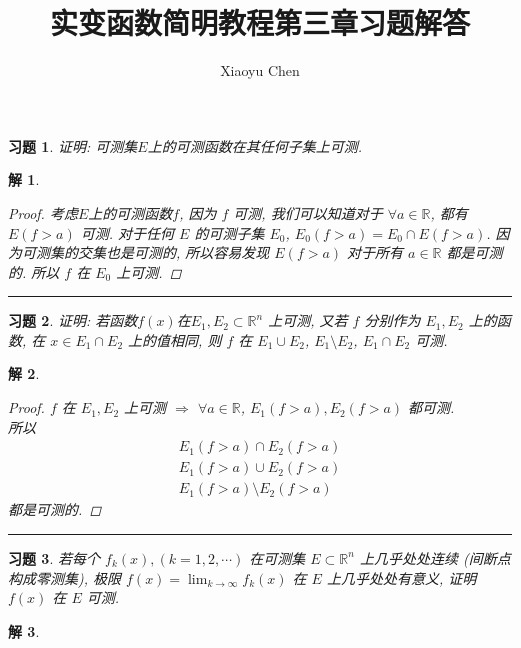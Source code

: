 \documentclass{article}
\title{实变函数简明教程第三章习题解答}
\author{Xiaoyu Chen}
\date{}
\newtheorem{problem}{习题}
\newtheorem{solution}{解}
\begin{document}
\maketitle
\begin{problem}
  证明: 可测集$E$上的可测函数在其任何子集上可测.
\end{problem}
\begin{solution}
  \begin{proof}
    考虑$E$上的可测函数$f$, 因为 $f$ 可测, 我们可以知道对于 $\forall a\in \mathbb{R}$, 都有 $E(f > a)$ 可测.
    对于任何 $E$ 的可测子集 $E_0$, $E_0(f > a) = E_0 \cap E(f > a)$.
    因为可测集的交集也是可测的, 所以容易发现 $E(f > a)$ 对于所有 $a \in \mathbb{R}$ 都是可测的.
    所以 $f$ 在 $E_0$ 上可测.
  \end{proof}
\end{solution}

\hrule

\begin{problem}
  证明: 若函数$f(x)$在$E_1, E_2\subset \mathbb{R}^n$ 上可测, 又若 $f$ 分别作为 $E_1, E_2$ 上的函数, 在 $x\in E_1\cap E_2$ 上的值相同, 则 $f$ 在 $E_1\cup E_2$, $E_1\setminus E_2$, $E_1\cap E_2$ 可测.
\end{problem}
\begin{solution}
  \begin{proof}
    $f$ 在 $E_1, E_2$ 上可测 $\Rightarrow$ $\forall a \in \mathbb{R}$, $E_1(f > a), E_2(f > a)$ 都可测. \\
    所以
    \begin{align*}
      E_1(f > a) \cap E_2(f > a) \\
      E_1(f > a) \cup E_2(f > a) \\
      E_1(f > a) \setminus E_2(f > a )
    \end{align*}
    都是可测的.
  \end{proof}
\end{solution}

\hrule

\begin{problem}
  若每个 $f_k(x), (k = 1, 2, \cdots)$ 在可测集 $E \subset \mathbb{R}^n$ 上几乎处处连续 (间断点构成零测集), 极限 $f(x) = \lim_{k\to\infty}f_k(x)$ 在 $E$ 上几乎处处有意义, 证明 $f(x)$ 在 $E$ 可测.
\end{problem}
\begin{solution}
\end{solution}
\end{document}
